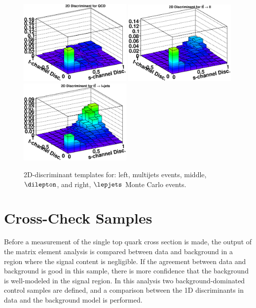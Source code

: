\begin{figure}[!h!tbp]
\includegraphics[width=0.49\textwidth]
{eps/MatrixElement/performance/2D-Discriminant_qcd}
\includegraphics[width=0.49\textwidth]
{eps/MatrixElement/performance/2D-Discriminant_dilepton}
\includegraphics[width=0.49\textwidth]
{eps/MatrixElement/performance/2D-Discriminant_lepjets}
\vspace{-0.1in}
\caption{2D-discriminant templates for: left,
multijets events, middle, $\dilepton$, and right, $\lepjets$ Monte
Carlo events.}
\label{qcdtt}
\end{figure}



\section{Cross-Check Samples}
\label{crosscheck}

Before a measurement of the single top quark cross section is made, the output of the matrix element analysis is compared between data and background in a region where the signal content is negligible. If the agreement between data and background is good in this sample, there is more confidence that the background is well-modeled in the signal region. In this analysis two background-dominated control
samples are defined, and a comparison between the 1D discriminants in
data and the background model is performed.

